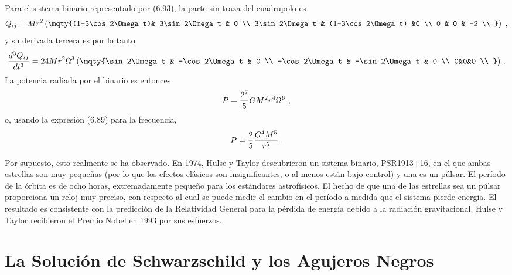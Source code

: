 \documentclass[11pt,b5paper,openany,twoside]{book}
\begin{document}
Para el sistema binario representado por (6.93), la parte sin traza del cuadrupolo es
\begin{equation}
Q_{ij} = Mr^2 \left(\mqty{(1+3\cos2\Omega t)&
3\sin2\Omega t & 0 \\  3\sin2\Omega t & (1-3\cos2\Omega t) &0 \\
0 & 0 & -2 \\ }\right)\ ,\label{6.107}
\end{equation}
y su derivada tercera es por lo tanto
\begin{equation}
{{d^3 Q_{ij}}\over{dt^3}}=
24 M r^2\Omega^3\left(\mqty{\sin2\Omega t &
-\cos2\Omega t & 0 \\  -\cos2\Omega t & -\sin2\Omega t & 0 \\
0&0&0 \\ }\right)\,.\label{6.108}
\end{equation}
La potencia radiada por el binario es entonces
\begin{equation}
P = {{2^7}\over 5}GM^2 r^4\Omega^6\ ,\label{6.109}
\end{equation}
o, usando la expresión (6.89) para la frecuencia,
\begin{equation}
P = {2\over 5}{{G^4 M^5}\over {r^5}}\,.\label{6.110}
\end{equation}

Por supuesto, esto realmente se ha observado.
En 1974, Hulse y Taylor descubrieron un sistema binario, PSR1913+16, en el que ambas estrellas son muy pequeñas (por lo que los efectos clásicos son insignificantes, o al menos están bajo control) y una es un púlsar.
El período de la órbita es de ocho horas, extremadamente pequeño para los estándares astrofísicos.
El hecho de que una de las estrellas sea un púlsar proporciona un reloj muy preciso, con respecto al cual se puede medir el cambio en el período a medida que el sistema pierde energía.
El resultado es consistente con la predicción de la Relatividad General para la pérdida de energía debido a la radiación gravitacional.
Hulse y Taylor recibieron el Premio Nobel en 1993 por sus esfuerzos.





\chapter{La Solución de Schwarzschild y los Agujeros Negros}
\end{document}
